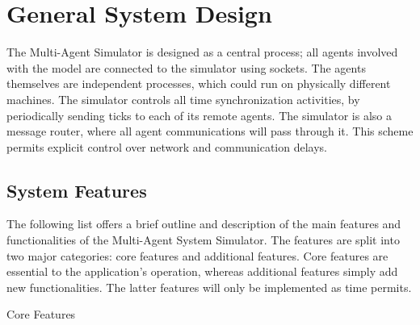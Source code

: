 \documentclass{article}
\begin{document}
\newpage
\section{General System Design}

The Multi-Agent Simulator is designed as a central process; all agents involved with the model are connected to the simulator using sockets. The agents themselves are independent processes, which could run on physically different machines. The simulator controls all time synchronization activities, by periodically sending ticks  to each of its remote agents. The simulator is also a message router, where all agent communications will pass through it. This scheme permits explicit control over network and communication delays.

\subsection{System Features}

The following list offers a brief outline and description of the main features and functionalities of the Multi-Agent System Simulator. The features are split into two major categories: core features and additional features. Core features are essential to the application's operation, whereas additional features simply add new functionalities. The latter features will only be implemented as time permits.
\begin{center} Core Features \end{center}
\end{document}
